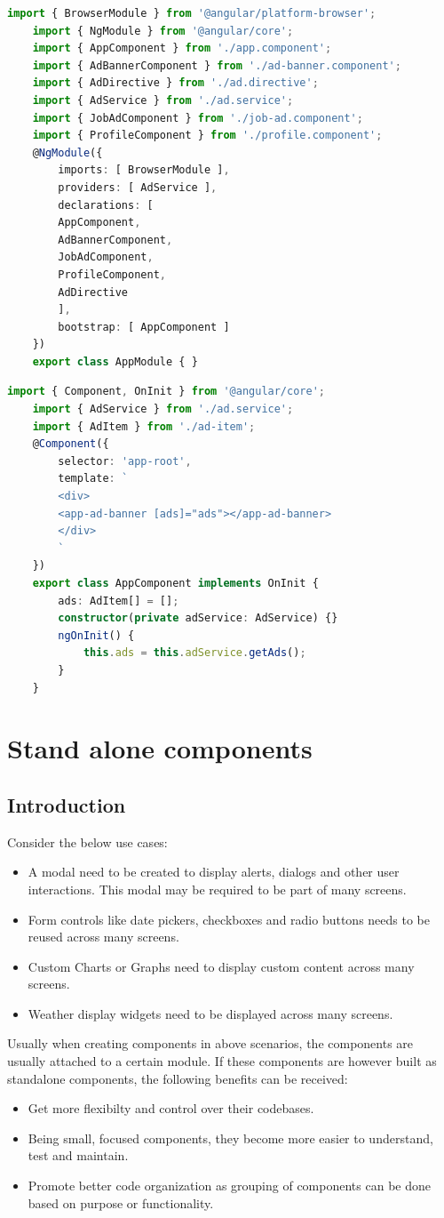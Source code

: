 \documentclass{report}
\begin{document}
\begin{lstlisting}[caption=app.module.ts, language=Typescript]
	import { BrowserModule } from '@angular/platform-browser';
	import { NgModule } from '@angular/core';
	import { AppComponent } from './app.component';
	import { AdBannerComponent } from './ad-banner.component';
	import { AdDirective } from './ad.directive';
	import { AdService } from './ad.service';
	import { JobAdComponent } from './job-ad.component';
	import { ProfileComponent } from './profile.component';
	@NgModule({
		imports: [ BrowserModule ],
		providers: [ AdService ],
		declarations: [
		AppComponent,
		AdBannerComponent,
		JobAdComponent,
		ProfileComponent,
		AdDirective
		],
		bootstrap: [ AppComponent ]
	})
	export class AppModule { }
\end{lstlisting}


\begin{lstlisting}[caption=app.component.ts, language=Typescript]
	import { Component, OnInit } from '@angular/core';
	import { AdService } from './ad.service';
	import { AdItem } from './ad-item';
	@Component({
		selector: 'app-root',
		template: `
		<div>
		<app-ad-banner [ads]="ads"></app-ad-banner>
		</div>
		`
	})
	export class AppComponent implements OnInit {
		ads: AdItem[] = [];
		constructor(private adService: AdService) {}
		ngOnInit() {
			this.ads = this.adService.getAds();
		}
	}
\end{lstlisting}

\chapter{Stand alone components}
\section{Introduction}
Consider the below use cases:
\begin{itemize}
	\item {A modal need to be created to display alerts, dialogs and other user interactions. This modal may be required to be part of many screens.}
	\item {Form controls like date pickers, checkboxes and radio buttons needs to be reused across many screens.}
	\item {Custom Charts or Graphs need to display custom content across many screens.}
	\item {Weather display widgets need to be displayed across many screens.}
\end{itemize}
Usually when creating components in above scenarios, the components are usually attached to a certain module. If these components are however built as standalone components, the following benefits can be received:
\begin{itemize}
	\item{Get more flexibilty and control over their codebases.}
	\item{Being small, focused components, they become more easier to understand, test and maintain. }
	\item{Promote better code organization as grouping of components can be done based on purpose or functionality. }
\end{itemize}
\end{document}
